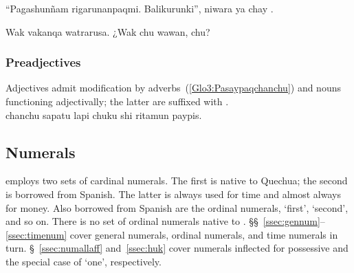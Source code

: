 %
{“Pagashunñam rigarunanpaqmi. Balikurunki”, niwara ya chay  .}%
{}%
{}{}%

%
{Wak vakanqa watrarusa. ¿Wak chu wawan, chu?}%
{}%
{}{}%

\subsubsection{Preadjectives}\label{ssec:preadj}
Adjectives admit modification by adverbs~(\ref{Glo3:Pasaypaqchanchu}) and nouns functioning adjectivally; the latter are suffixed with .\\

%
{ chanchu sapatu  lapi chuku shi ritamun paypis.}%
{}%
{}{}%

\subsection{Numerals}\label{sec:numerals}
\SYQ{} employs two sets of cardinal numerals. The first is native to Quechua; the second is borrowed from Spanish. The latter is always used for time and almost always for money. Also borrowed from Spanish are the ordinal numerals,  ‘first’,  ‘second’, and so on. There is no set of ordinal numerals native to \SYQ. §§~\ref{ssec:gennum}--\ref{ssec:timenum} cover general numerals, ordinal numerals, and time numerals in turn. §~\ref{ssec:numallaff} and~\ref{ssec:huk} cover numerals inflected for possessive and the special case of  ‘one’, respectively.

